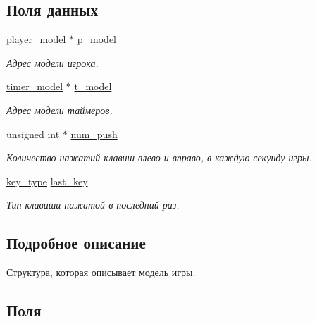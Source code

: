 \subsection*{Поля данных}
\begin{DoxyCompactItemize}
\item 
\hyperlink{structplayer__model}{player\+\_\+model} $\ast$ \hyperlink{structgame__model_a3bcbf217f1b8c8f3e2407b852da268ed}{p\+\_\+model}
\begin{DoxyCompactList}\small\item\em Адрес модели игрока. \end{DoxyCompactList}\item 
\hyperlink{structtimer__model}{timer\+\_\+model} $\ast$ \hyperlink{structgame__model_aadcf1b0427739bb95070a015c4b43988}{t\+\_\+model}
\begin{DoxyCompactList}\small\item\em Адрес модели таймеров. \end{DoxyCompactList}\item 
unsigned int $\ast$ \hyperlink{structgame__model_abf2236d6bb182f60659d811a096ba0b3}{num\+\_\+push}
\begin{DoxyCompactList}\small\item\em Количество нажатий клавиш влево и вправо, в каждую секунду игры. \end{DoxyCompactList}\item 
\hyperlink{game__model_8h_ab56b05c2bb34d1168dc2576c83a1e287}{key\+\_\+type} \hyperlink{structgame__model_a33e6b79824419341cc8aa5246f0836d4}{last\+\_\+key}
\begin{DoxyCompactList}\small\item\em Тип клавиши нажатой в последний раз. \end{DoxyCompactList}\end{DoxyCompactItemize}


\subsection{Подробное описание}
Структура, которая описывает модель игры. 

\subsection{Поля}
\mbox{\label{structgame__model_a33e6b79824419341cc8aa5246f0836d4}} 
